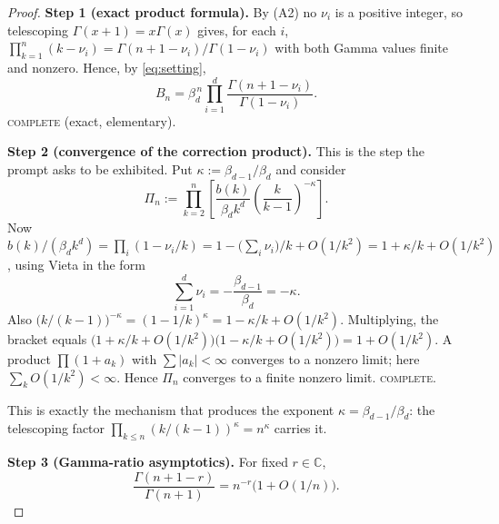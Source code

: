\documentclass[11pt]{article}
\theoremstyle{definition}
\newcommand{\bd}{\beta_d}
\newcommand{\bdm}{\beta_{d-1}}
\newcommand{\C}{\mathbb{C}}
\begin{document}
\begin{proof}
\textbf{Step 1 (exact product formula).} By (A2) no $\nu_i$ is a positive
integer, so telescoping $\Gamma(x+1)=x\Gamma(x)$ gives, for each $i$,
$\prod_{k=1}^{n}(k-\nu_i)=\Gamma(n+1-\nu_i)/\Gamma(1-\nu_i)$ with both Gamma values
finite and nonzero. Hence, by \eqref{eq:setting},
\begin{equation}\label{eq:Bnexact}
B_n=\bd^{\,n}\prod_{i=1}^{d}\frac{\Gamma(n+1-\nu_i)}{\Gamma(1-\nu_i)} .
\end{equation}
\textsc{complete} (exact, elementary).

\medskip\noindent\textbf{Step 2 (convergence of the correction product).}
This is the step the prompt asks to be exhibited. Put $\kappa:=\bdm/\bd$ and
consider
\[
\Pi_n:=\prod_{k=2}^{n}\left[\frac{b(k)}{\bd k^{d}}\left(\frac{k}{k-1}\right)^{-\kappa}\right].
\]
Now $b(k)/(\bd k^d)=\prod_i(1-\nu_i/k)=1-\bigl(\sum_i \nu_i\bigr)/k+O(1/k^2)
=1+\kappa/k+O(1/k^2)$, using Vieta in the form
\begin{equation}\label{eq:vieta}
\sum_{i=1}^{d}\nu_i=-\frac{\bdm}{\bd}=-\kappa .
\end{equation}
Also $\bigl(k/(k-1)\bigr)^{-\kappa}=(1-1/k)^{\kappa}=1-\kappa/k+O(1/k^2)$.
Multiplying, the bracket equals
$\bigl(1+\kappa/k+O(1/k^2)\bigr)\bigl(1-\kappa/k+O(1/k^2)\bigr)=1+O(1/k^2)$.
A product $\prod(1+a_k)$ with $\sum|a_k|<\infty$ converges to a nonzero limit;
here $\sum_k O(1/k^2)<\infty$. Hence $\Pi_n$ converges to a finite nonzero
limit. \textsc{complete.}

This is exactly the mechanism that produces the exponent $\kappa=\bdm/\bd$:
the telescoping factor $\prod_{k\le n}(k/(k-1))^{\kappa}=n^{\kappa}$ carries it.

\medskip\noindent\textbf{Step 3 (Gamma-ratio asymptotics).}
For fixed $r\in\C$,
\begin{equation}\label{eq:gammaratio}
\frac{\Gamma(n+1-r)}{\Gamma(n+1)}=n^{-r}\bigl(1+O(1/n)\bigr).
\end{equation}


\end{proof}
\end{document}
